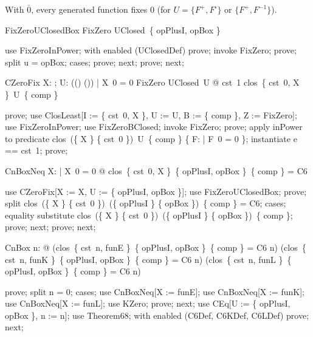 \documentclass{article}
\begin{document}
With $\bar 0$, every generated function fixes $0$ (for $U = \{F^+, F^\square\}$ or $\{F^+, F^{-1}\}$).

\begin{theorem}{FixZeroUClosedBox}
  FixZero \in UClosed~\{ opPlusI, opBox \}
\end{theorem}

\begin{zproof}
use FixZeroInPower;
with enabled (UClosedDef) prove;
invoke FixZero;
prove;
split u = opBox;
cases;
prove;
next;
prove;
next;
\end{zproof}

\begin{theorem}{CZeroFix}
  \forall X: \nat \fun \nat; U: \power ((\nat \fun \nat) \fun (\nat \fun \nat)) | X~0 = 0 \land FixZero \in UClosed~U @ \lnot cst~1 \in clos~\{ cst~0, X \}~U~\{ comp \}
\end{theorem}

\begin{zproof}
prove;
use ClosLeast[I := \{ cst~0, X \}, U := U, B := \{ comp \}, Z := FixZero];
use FixZeroInPower;
use FixZeroBClosed;
invoke FixZero;
prove;
apply inPower to predicate clos~(\{ X \} \cup \{ cst~0 \})~U~\{ comp \} \in \power \{ F: \nat \fun \nat | F~0 = 0 \};
instantiate e == cst~1;
prove;
\end{zproof}


\begin{theorem}{CnBoxNeq}
  \forall X: \nat \fun \nat | X~0 = 0 @ \lnot clos~\{ cst~0, X \}~\{ opPlusI, opBox \}~\{ comp \} = C6
\end{theorem}

\begin{zproof}
use CZeroFix[X := X, U := \{ opPlusI, opBox \}];
use FixZeroUClosedBox;
prove;
split clos~(\{ X \} \cup \{ cst~0 \})~(\{ opPlusI \} \cup \{ opBox \})~\{ comp \} = C6;
cases;
equality substitute clos~(\{ X \} \cup \{ cst~0 \})~(\{ opPlusI \} \cup \{ opBox \})~\{ comp \};
prove;
next;
prove;
next;
\end{zproof}

\begin{theorem}{CnBox}
  \forall n: \nat @ (clos~\{ cst~n, funE \}~\{ opPlusI, opBox \}~\{ comp \} = C6  \leq n) \land (clos~\{ cst~n, funK \}~\{ opPlusI, opBox \}~\{ comp \} = C6  \leq n) \land (clos~\{ cst~n, funL \}~\{ opPlusI, opBox \}~\{ comp \} = C6  \leq n)
\end{theorem}

\begin{zproof}
prove;
split n = 0;
cases;
use CnBoxNeq[X := funE];
use CnBoxNeq[X := funK];
use CnBoxNeq[X := funL];
use KZero;
prove;
next;
use CEq[U := \{ opPlusI, opBox \}, n := n];
use Theorem68;
with enabled (C6Def, C6KDef, C6LDef) prove;
next;
\end{zproof}
\end{document}
